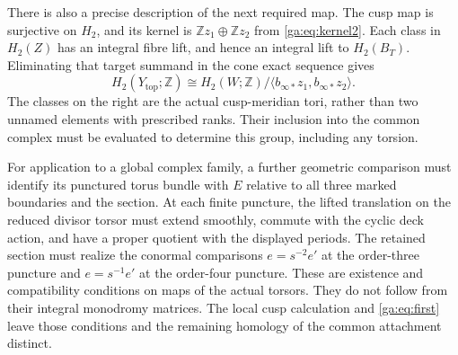 There is also a precise description of the next required map.
The cusp map is surjective on $H_2$, and its kernel is
$\mathbb Zz_1\oplus\mathbb Zz_2$ from \eqref{ga:eq:kernel2}.
Each class in $H_2(Z)$ has an integral fibre lift, and hence an integral
lift to $H_2(B_T)$. Eliminating that target summand in the cone exact
sequence gives
\begin{equation}\label{ga:eq:next}
H_2(Y_{\mathrm{top}};\mathbb Z)
\cong H_2(W;\mathbb Z)/
\langle b_{\infty*}z_1,b_{\infty*}z_2\rangle.
\end{equation}
The classes on the right are the actual cusp-meridian tori, rather than
two unnamed elements with prescribed ranks.
Their inclusion into the common complex must be evaluated to determine
this group, including any torsion.

For application to a global complex family, a further geometric comparison
must identify its punctured torus bundle with $E$ relative to all three
marked boundaries and the section. At each finite puncture, the lifted
translation on the reduced divisor torsor must extend smoothly, commute
with the cyclic deck action, and have a proper quotient with the displayed periods.
The retained section must realize the conormal comparisons
$e=s^{-2}e'$ at the order-three puncture and $e=s^{-1}e'$ at the order-four puncture.
These are existence and compatibility conditions on maps of the actual
torsors. They do not follow from their integral monodromy matrices.
The local cusp calculation and \eqref{ga:eq:first} leave those conditions
and the remaining homology of the common attachment distinct.
